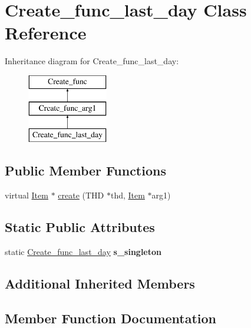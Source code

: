 \hypertarget{classCreate__func__last__day}{}\section{Create\+\_\+func\+\_\+last\+\_\+day Class Reference}
\label{classCreate__func__last__day}
Inheritance diagram for Create\+\_\+func\+\_\+last\+\_\+day\+:\begin{figure}[H]
\begin{center}
\leavevmode
\includegraphics[height=3.000000cm]{classCreate__func__last__day}
\end{center}
\end{figure}
\subsection*{Public Member Functions}
\begin{DoxyCompactItemize}
\item 
virtual \mbox{\hyperlink{classItem}{Item}} $\ast$ \mbox{\hyperlink{classCreate__func__last__day_a4ae3a980f9f7010fc179ce3b325fc566}{create}} (T\+HD $\ast$thd, \mbox{\hyperlink{classItem}{Item}} $\ast$arg1)
\end{DoxyCompactItemize}
\subsection*{Static Public Attributes}
\begin{DoxyCompactItemize}
\item 
\mbox{\label{classCreate__func__last__day_a62944bc943d590ed49bcdd77ac9c70ea}} 
static \mbox{\hyperlink{classCreate__func__last__day}{Create\+\_\+func\+\_\+last\+\_\+day}} {\bfseries s\+\_\+singleton}
\end{DoxyCompactItemize}
\subsection*{Additional Inherited Members}


\subsection{Member Function Documentation}
\mbox{\label{classCreate__func__last__day_a4ae3a980f9f7010fc179ce3b325fc566}} 
